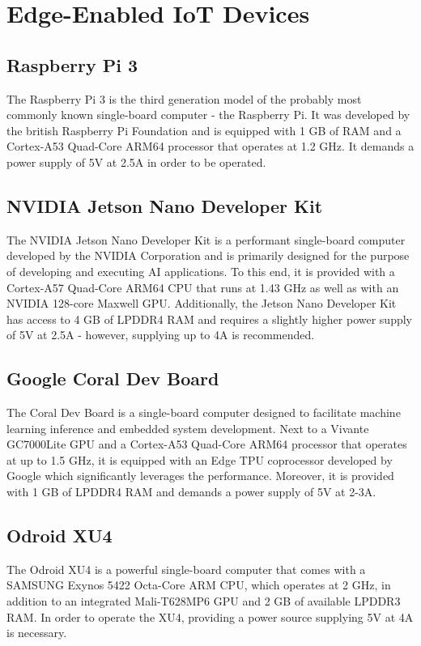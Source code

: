 \section{Edge-Enabled IoT Devices}
\subsection{Raspberry Pi 3}
The Raspberry Pi 3 is the third generation model of the probably most commonly known single-board computer - the Raspberry Pi. It was developed by the british Raspberry Pi Foundation and is equipped with 1 GB of RAM and a Cortex-A53 Quad-Core ARM64 processor that operates at 1.2 GHz. It demands a power supply of 5V at 2.5A in order to be operated.


\subsection{NVIDIA Jetson Nano Developer Kit}
The NVIDIA Jetson Nano Developer Kit is a performant single-board computer developed by the NVIDIA Corporation and is primarily designed for the purpose of developing and executing AI applications. To this end, it is provided with a Cortex-A57 Quad-Core ARM64 CPU that runs at 1.43 GHz as well as with an NVIDIA 128-core Maxwell GPU. Additionally, the Jetson Nano Developer Kit has access to 4 GB of LPDDR4 RAM and requires a slightly higher power supply of 5V at 2.5A - however, supplying up to 4A is recommended.

\subsection{Google Coral Dev Board}
The Coral Dev Board is a single-board computer designed to facilitate machine learning inference and embedded system development. Next to a Vivante GC7000Lite GPU and a Cortex-A53 Quad-Core ARM64 processor that operates at up to 1.5 GHz, it is equipped with an Edge TPU coprocessor developed by Google which significantly leverages the performance. Moreover, it is provided with 1 GB of LPDDR4 RAM and demands a power supply of 5V at 2-3A.

\subsection{Odroid XU4}
The Odroid XU4 is a powerful single-board computer that comes with a SAMSUNG Exynos 5422 Octa-Core ARM CPU, which operates at 2 GHz, in addition to an integrated Mali-T628MP6 GPU and 2 GB of available LPDDR3 RAM. In order to operate the XU4, providing a power source supplying 5V at 4A is necessary.

